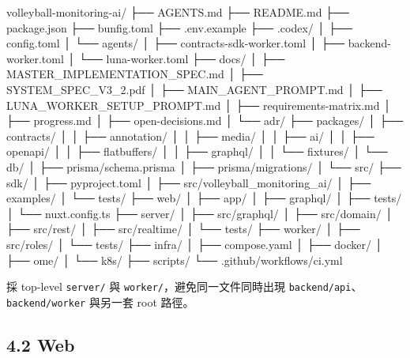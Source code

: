 \documentclass[
  9pt,
  a4paper,
]{article}
\newenvironment{Shaded}{}{}
\newcommand{\NormalTok}[1]{#1}
\begin{document}
\begin{Shaded}
\begin{Highlighting}[]
\NormalTok{volleyball{-}monitoring{-}ai/}
\NormalTok{├── AGENTS.md}
\NormalTok{├── README.md}
\NormalTok{├── package.json}
\NormalTok{├── bunfig.toml}
\NormalTok{├── .env.example}
\NormalTok{├── .codex/}
\NormalTok{│   ├── config.toml}
\NormalTok{│   └── agents/}
\NormalTok{│       ├── contracts{-}sdk{-}worker.toml}
\NormalTok{│       ├── backend{-}worker.toml}
\NormalTok{│       └── luna{-}worker.toml}
\NormalTok{├── docs/}
\NormalTok{│   ├── MASTER\_\allowbreak{}IMPLEMENTATION\_\allowbreak{}SPEC.md}
\NormalTok{│   ├── SYSTEM\_\allowbreak{}SPEC\_\allowbreak{}V3\_\allowbreak{}2.pdf}
\NormalTok{│   ├── MAIN\_\allowbreak{}AGENT\_\allowbreak{}PROMPT.md}
\NormalTok{│   ├── LUNA\_\allowbreak{}WORKER\_\allowbreak{}SETUP\_\allowbreak{}PROMPT.md}
\NormalTok{│   ├── requirements{-}matrix.md}
\NormalTok{│   ├── progress.md}
\NormalTok{│   ├── open{-}decisions.md}
\NormalTok{│   └── adr/}
\NormalTok{├── packages/}
\NormalTok{│   ├── contracts/}
\NormalTok{│   │   ├── annotation/}
\NormalTok{│   │   ├── media/}
\NormalTok{│   │   ├── ai/}
\NormalTok{│   │   ├── openapi/}
\NormalTok{│   │   ├── flatbuffers/}
\NormalTok{│   │   ├── graphql/}
\NormalTok{│   │   └── fixtures/}
\NormalTok{│   └── db/}
\NormalTok{│       ├── prisma/schema.prisma}
\NormalTok{│       ├── prisma/migrations/}
\NormalTok{│       └── src/}
\NormalTok{├── sdk/}
\NormalTok{│   ├── pyproject.toml}
\NormalTok{│   ├── src/volleyball\_\allowbreak{}monitoring\_\allowbreak{}ai/}
\NormalTok{│   ├── examples/}
\NormalTok{│   └── tests/}
\NormalTok{├── web/}
\NormalTok{│   ├── app/}
\NormalTok{│   ├── graphql/}
\NormalTok{│   ├── tests/}
\NormalTok{│   └── nuxt.config.ts}
\NormalTok{├── server/}
\NormalTok{│   ├── src/graphql/}
\NormalTok{│   ├── src/domain/}
\NormalTok{│   ├── src/rest/}
\NormalTok{│   ├── src/realtime/}
\NormalTok{│   └── tests/}
\NormalTok{├── worker/}
\NormalTok{│   ├── src/roles/}
\NormalTok{│   └── tests/}
\NormalTok{├── infra/}
\NormalTok{│   ├── compose.yaml}
\NormalTok{│   ├── docker/}
\NormalTok{│   ├── ome/}
\NormalTok{│   └── k8s/}
\NormalTok{├── scripts/}
\NormalTok{└── .github/workflows/ci.yml}
\end{Highlighting}
\end{Shaded}

採 top-level \texttt{server/} 與 \texttt{worker/}，避免同一文件同時出現
\texttt{backend/api}、\texttt{backend/worker} 與另一套 root 路徑。

\subsection{4.2 Web}\label{42-web}
\end{document}
